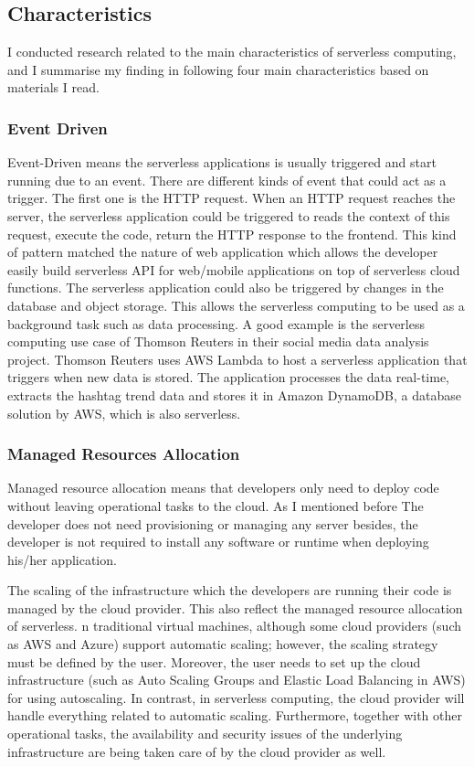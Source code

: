 \subsection{Characteristics}
I conducted research related to the main characteristics of serverless computing, and I summarise my finding in following four main characteristics based on materials \cite{castro2019rise}\cite{lee2018evaluation}\cite{jonas2019cloud} I read.
\subsubsection{Event Driven}
Event-Driven means the serverless applications is usually triggered and start running due to an event. There are different kinds of event that could act as a trigger. The first one is the HTTP request. When an HTTP request reaches the server, the serverless application could be triggered to reads the context of this request, execute the code, return the HTTP response to the frontend. This kind of pattern matched the nature of web application which allows the developer easily build serverless API for web/mobile applications on top of serverless cloud functions. The serverless application could also be triggered by changes in the database and object storage. This allows the serverless computing to be used as a background task such as data processing. A good example is the serverless computing use case of Thomson Reuters in their social media data analysis project\cite{ThomsonR38:online}. Thomson Reuters uses AWS Lambda to host a serverless application that triggers when new data is stored. The application processes the data real-time, extracts the hashtag trend data and stores it in Amazon DynamoDB, a database solution by AWS, which is also serverless.
\subsubsection{Managed Resources Allocation}
Managed resource allocation means that developers only need to deploy code without leaving operational tasks to the cloud. As I mentioned before The developer does not need provisioning or managing any server besides, the developer is not required to install any software or runtime \cite{Serverle64:online} when deploying his/her application. 
\par
The scaling of the infrastructure which the developers are running their code is managed by the cloud provider. This also reflect the managed resource allocation of serverless. n traditional virtual machines, although some cloud providers (such as AWS and Azure) support automatic scaling; however, the scaling strategy must be defined by the user. Moreover, the user needs to set up the cloud infrastructure (such as Auto Scaling Groups and Elastic Load Balancing in AWS) for using autoscaling. In contrast, in serverless computing, the cloud provider will handle everything related to automatic scaling.
Furthermore, together with other operational tasks, the availability and security issues of the underlying infrastructure are being taken care of by the cloud provider as well. 
